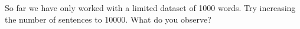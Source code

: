 %
%

\begin{exercise}
So far we have only worked with a limited dataset of 1000 words. Try increasing the number of sentences to 10000. What do you observe?

\end{exercise}
